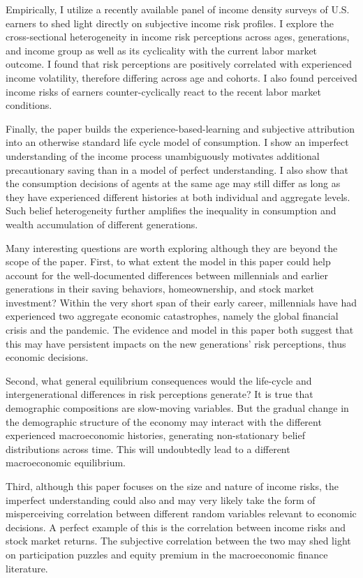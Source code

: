 \documentclass[12pt,notitlepage,onecolumn,aps,pra]{article}
\begin{document}
Empirically, I utilize a recently available panel of income density
surveys of U.S. earners to shed light directly on subjective income risk
profiles. I explore the cross-sectional heterogeneity in income risk
perceptions across ages, generations, and income group as well as its
cyclicality with the current labor market outcome. I found that risk
perceptions are positively correlated with experienced income
volatility, therefore differing across age and cohorts. I also found
perceived income risks of earners counter-cyclically react to the recent
labor market conditions.

Finally, the paper builds the experience-based-learning and subjective
attribution into an otherwise standard life cycle model of consumption.
I show an imperfect understanding of the income process unambiguously
motivates additional precautionary saving than in a model of perfect
understanding. I also show that the consumption decisions of agents at
the same age may still differ as long as they have experienced different
histories at both individual and aggregate levels. Such belief
heterogeneity further amplifies the inequality in consumption and wealth
accumulation of different generations.

Many interesting questions are worth exploring although they are beyond
the scope of the paper. First, to what extent the model in this paper
could help account for the well-documented differences between
millennials and earlier generations in their saving behaviors,
homeownership, and stock market investment? Within the very short span
of their early career, millennials have had experienced two aggregate
economic catastrophes, namely the global financial crisis and the
pandemic. The evidence and model in this paper both suggest that this
may have persistent impacts on the new generations' risk perceptions,
thus economic decisions.

Second, what general equilibrium consequences would the life-cycle and
intergenerational differences in risk perceptions generate? It is true
that demographic compositions are slow-moving variables. But the gradual
change in the demographic structure of the economy may interact with the
different experienced macroeconomic histories, generating non-stationary
belief distributions across time. This will undoubtedly lead to a
different macroeconomic equilibrium.

Third, although this paper focuses on the size and nature of income
risks, the imperfect understanding could also and may very likely take
the form of misperceiving correlation between different random variables
relevant to economic decisions. A perfect example of this is the
correlation between income risks and stock market returns. The
subjective correlation between the two may shed light on participation
puzzles and equity premium in the macroeconomic finance literature.


    
    



    
\end{document}
